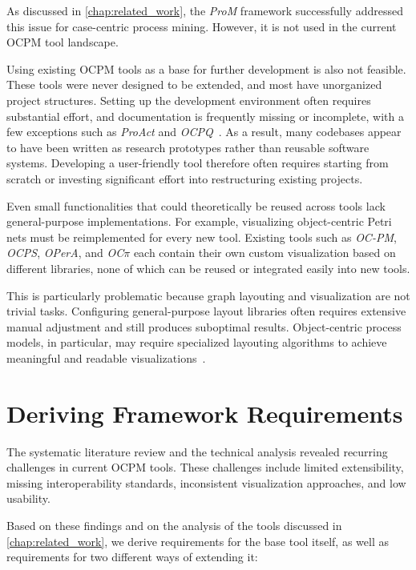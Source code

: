 As discussed in \cref{chap:related_work}, the \textit{ProM} framework successfully addressed this issue for case-centric process mining. However, it is not used in the current OCPM tool landscape.

Using existing OCPM tools as a base for further development is also not feasible. These tools were never designed to be extended, and most have unorganized project structures. Setting up the development environment often requires substantial effort, and documentation is frequently missing or incomplete, with a few exceptions such as \textit{ProAct} and \textit{OCPQ}~\cite{proact, ocpq}. As a result, many codebases appear to have been written as research prototypes rather than reusable software systems. Developing a user-friendly tool therefore often requires starting from scratch or investing significant effort into restructuring existing projects.

Even small functionalities that could theoretically be reused across tools lack general-purpose implementations. For example, visualizing object-centric Petri nets must be reimplemented for every new tool. Existing tools such as \textit{OC-PM}, \textit{OCPS}, \textit{OPerA}, and \textit{OC$\pi$} each contain their own custom visualization based on different libraries, none of which can be reused or integrated easily into new tools.

This is particularly problematic because graph layouting and visualization are not trivial tasks. Configuring general-purpose layout libraries often requires extensive manual adjustment and still produces suboptimal results. Object-centric process models, in particular, may require specialized layouting algorithms to achieve meaningful and readable visualizations~\cite{dfglayouting}.

\section{Deriving Framework Requirements}
\label{sec:requirements}

The systematic literature review and the technical analysis revealed recurring challenges in current OCPM tools. These challenges include limited extensibility, missing interoperability standards, inconsistent visualization approaches, and low usability.

Based on these findings and on the analysis of the tools discussed in \cref{chap:related_work}, we derive requirements for the base tool itself, as well as requirements for two different ways of extending it:


